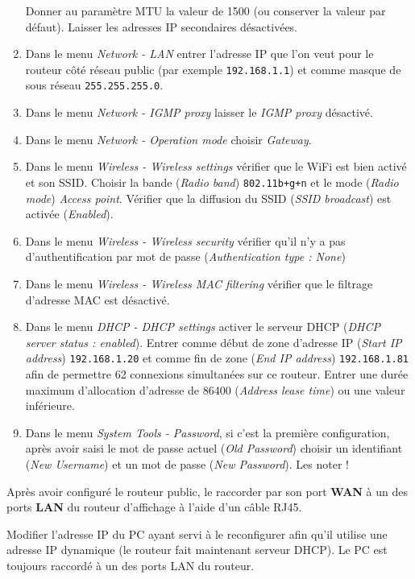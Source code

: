 \documentclass[a4paper]{ffco-rapport}
\begin{document}
\begin{enumerate}
					Donner au paramètre MTU la valeur de 1500 (ou conserver la valeur par défaut).
					Laisser les adresses IP secondaires désactivées.
		\item Dans le menu \emph{Network - LAN} entrer l'adresse IP que l'on veut pour le routeur côté réseau public (par exemple \texttt{192.168.1.1}) et comme
					masque de sous réseau \texttt{255.255.255.0}.
		\item Dans le menu \emph{Network - IGMP proxy} laisser le \emph{IGMP proxy} désactivé.
		\item Dans le menu \emph{Network - Operation mode} choisir \emph{Gateway}.
		\item Dans le menu \emph{Wireless - Wireless settings} vérifier que le WiFi est bien activé et son SSID. Choisir la bande (\emph{Radio band}) \texttt{802.11b+g+n} et
					le mode (\emph{Radio mode}) \emph{Access point}. Vérifier que la diffusion du SSID (\emph{SSID broadcast}) est activée (\emph{Enabled}).
		\item Dans le menu \emph{Wireless - Wireless security} vérifier qu'il n'y a pas d'authentification par mot de passe (\emph{Authentication type : None})
		\item Dans le menu \emph{Wireless - Wireless MAC filtering} vérifier que le filtrage d'adresse MAC est désactivé.
		\item Dans le menu \emph{DHCP - DHCP settings} activer le serveur DHCP (\emph{DHCP server status : enabled}).
					Entrer comme début de zone d'adresse IP (\emph{Start IP address}) \texttt{192.168.1.20} et comme fin de zone (\emph{End IP address}) \texttt{192.168.1.81} afin de permettre 62 connexions simultanées sur ce routeur. Entrer une durée maximum d'allocation d'adresse de 86400 (\emph{Address lease time}) ou une valeur inférieure.
		\item Dans le menu \emph{System Tools - Password}, si c'est la première configuration, après avoir saisi le mot de passe actuel (\emph{Old Password}) choisir un
					identifiant (\emph{New Username}) et un mot de passe (\emph{New Password}). Les noter !
	\end{enumerate}
	
	Après avoir configuré le routeur public, le raccorder par son port \textbf{WAN} à un des ports \textbf{LAN} du routeur d'affichage à l'aide d'un câble RJ45.
	
	Modifier l'adresse IP du PC ayant servi à le reconfigurer afin qu'il utilise une adresse IP dynamique (le routeur fait maintenant serveur DHCP). Le PC est toujours raccordé à un des ports LAN du routeur.
	
\end{document}
